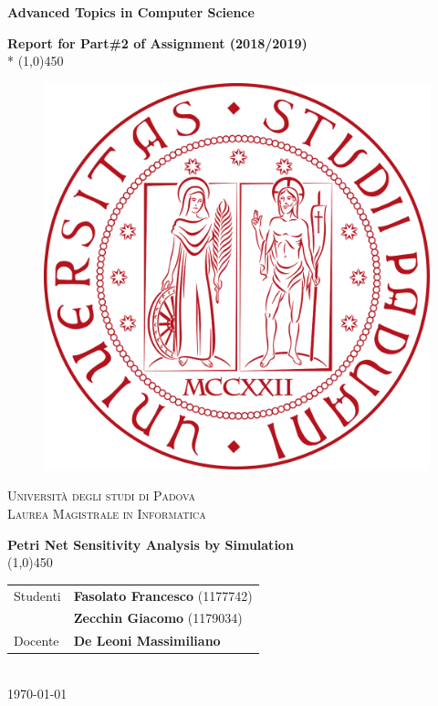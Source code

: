 \documentclass[a4paper,12pt]{article}
\begin{document}

	\begin{titlepage}
		\centering
		\vspace{7cm}
		{\huge\bfseries Advanced Topics in Computer Science\par}
		\vspace*{0,5cm}
		{\Large\bfseries Report for Part\#2 of Assignment (2018/2019)} \\*
		\line(1,0){450} \\
		\vspace*{2cm}
		\begin{figure}[h!]
		    \centering
		    \includegraphics[scale=0.20]{figures/unipd_logo.png}
		    \label{fig:unipd_logo}
		\end{figure}
		{\scshape\Large Università degli studi di Padova\\ \large Laurea Magistrale in Informatica \par}
		\vspace{2cm}
		{\LARGE\bfseries Petri Net Sensitivity Analysis by Simulation}\\
		\line(1,0){450}\\
		\vspace{1cm}
		\begin{tabular}{l|l}
			 Studenti  & \textbf{Fasolato Francesco} (1177742)\\ & \textbf{Zecchin Giacomo} (1179034) \\
			 Docente    & \textbf{De Leoni Massimiliano} \\
		\end{tabular}\\
		\vspace*{3,5cm}
        \today
	\end{titlepage}




	\label{LastFrontPage}
		\newpage
			\pagestyle{mymain}
			
	\label{LastPage}
\end{document}
